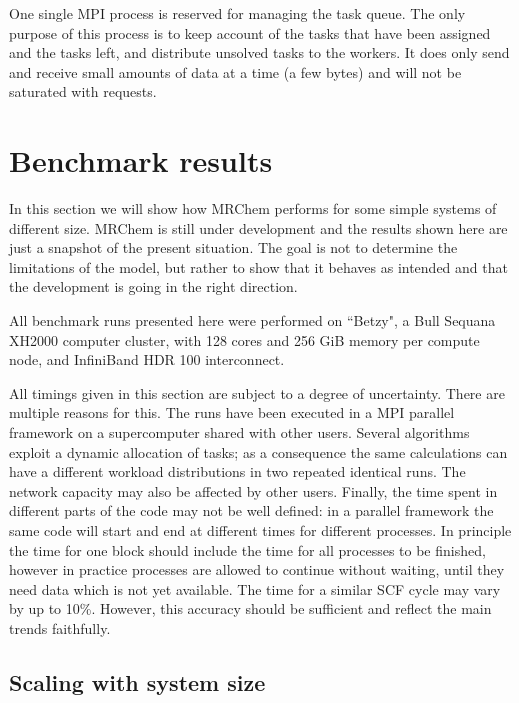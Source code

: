 \documentclass[journal=jctcce, manuscript=article]{achemso}
\begin{document}
One single MPI process is reserved for managing the task queue. The only purpose of this process is to keep account of the tasks that have been assigned and the tasks left, and distribute unsolved tasks to the workers. It does only send and receive small amounts of data at a time (a few bytes) and will not be saturated with requests.


\section{Benchmark results}
In this section we will show how MRChem performs for some simple systems of different size. MRChem is still under development and the results shown here are just a snapshot of the present situation. The goal is not to determine the limitations of the model, but rather to show that it behaves as intended and that the development is going in the right direction.

All benchmark runs presented here were performed on ``Betzy", a Bull Sequana XH2000 computer cluster, with 128 cores and 256 GiB memory per compute node, and InfiniBand HDR 100 interconnect.\cite{Betzy}

All timings given in this section are subject to a degree of uncertainty. There are multiple reasons for this. The runs have been executed in a MPI parallel framework on a supercomputer shared with other users. Several algorithms exploit a dynamic allocation of tasks; as a consequence the same calculations can have a different workload distributions in two repeated identical runs. The network capacity may also be affected by other users. Finally, the time spent in different parts of the code may not be well defined: in a parallel framework the same code will start and end at different times for different processes. In principle the time for one block should include the time for all processes to be finished, however in practice processes are allowed to continue without waiting, until they need data which is not yet available.
The time for a similar \ac{SCF} cycle may vary by up to 10\%. However, this accuracy should be sufficient and reflect the main trends faithfully. 

\subsection{Scaling with system size}
\end{document}
